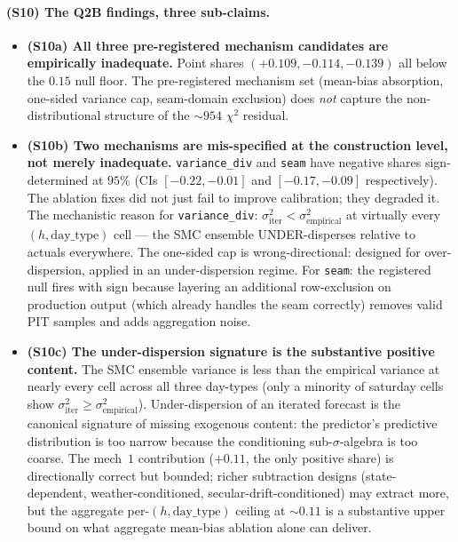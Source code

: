 \documentclass[11pt]{article}
\theoremstyle{definition}
\theoremstyle{plain}
\begin{document}
\paragraph{(S10) The Q2B findings, three sub-claims.}
\begin{itemize}[leftmargin=2em]
\item \textbf{(S10a) All three pre-registered mechanism candidates
are empirically inadequate.} Point shares
$(+0.109, -0.114, -0.139)$ all below the $0.15$ null floor.
The pre-registered mechanism set (mean-bias absorption, one-sided
variance cap, seam-domain exclusion) does \emph{not} capture the
non-distributional structure of the $\sim 954$ $\chi^{2}$ residual.

\item \textbf{(S10b) Two mechanisms are mis-specified at the
construction level, not merely inadequate.} \texttt{variance\_div}
and \texttt{seam} have negative shares sign-determined at $95\%$
(CIs $[-0.22, -0.01]$ and $[-0.17, -0.09]$ respectively). The
ablation fixes did not just fail to improve calibration; they
degraded it. The mechanistic reason for \texttt{variance\_div}:
$\sigma^{2}_{\mathrm{iter}} < \sigma^{2}_{\mathrm{empirical}}$
at virtually every $(h, \mathrm{day\_type})$ cell --- the SMC
ensemble UNDER-disperses relative to actuals everywhere. The
one-sided cap is wrong-directional: designed for over-dispersion,
applied in an under-dispersion regime. For \texttt{seam}: the
registered null fires with sign because layering an additional
row-exclusion on production output (which already handles the
seam correctly) removes valid PIT samples and adds aggregation
noise.

\item \textbf{(S10c) The under-dispersion signature is the
substantive positive content.} The SMC ensemble variance is less
than the empirical variance at nearly every cell across all three
day-types (only a minority of saturday cells show
$\sigma^{2}_{\mathrm{iter}} \geq \sigma^{2}_{\mathrm{empirical}}$).
Under-dispersion of an iterated forecast is the canonical signature
of missing exogenous content: the predictor's predictive
distribution is too narrow because the conditioning sub-$\sigma$-algebra
is too coarse. The mech~$1$ contribution ($+0.11$, the only
positive share) is directionally correct but bounded; richer
subtraction designs (state-dependent, weather-conditioned,
secular-drift-conditioned) may extract more, but the aggregate
per-$(h, \mathrm{day\_type})$ ceiling at $\sim 0.11$ is a
substantive upper bound on what aggregate mean-bias ablation
alone can deliver.
\end{itemize}
\end{document}
